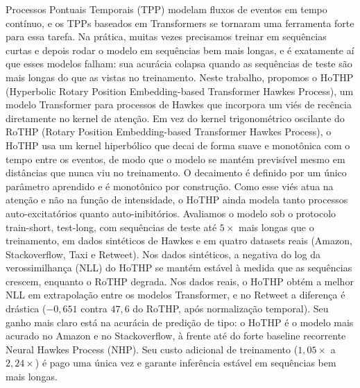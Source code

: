 Processos Pontuais Temporais (\gls{TPP}) modelam fluxos de eventos em tempo contínuo, e os TPPs baseados em Transformers se tornaram uma ferramenta forte para essa tarefa. Na prática, muitas vezes precisamos treinar em sequências curtas e depois rodar o modelo em sequências bem mais longas, e é exatamente aí que esses modelos falham: sua acurácia colapsa quando as sequências de teste são mais longas do que as vistas no treinamento. Neste trabalho, propomos o HoTHP (Hyperbolic Rotary Position Embedding-based Transformer Hawkes Process), um modelo Transformer para processos de Hawkes que incorpora um viés de recência diretamente no kernel de atenção. Em vez do kernel trigonométrico oscilante do RoTHP (Rotary Position Embedding-based Transformer Hawkes Process), o HoTHP usa um kernel hiperbólico que decai de forma suave e monotônica com o tempo entre os eventos, de modo que o modelo se mantém previsível mesmo em distâncias que nunca viu no treinamento. O decaimento é definido por um único parâmetro aprendido e é monotônico por construção. Como esse viés atua na atenção e não na função de intensidade, o HoTHP ainda modela tanto processos auto-excitatórios quanto auto-inibitórios. Avaliamos o modelo sob o protocolo train-short, test-long, com sequências de teste até $5\times$ mais longas que o treinamento, em dados sintéticos de Hawkes e em quatro datasets reais (Amazon, Stackoverflow, Taxi e Retweet). Nos dados sintéticos, a negativa do log da verossimilhança (\gls{NLL}) do HoTHP se mantém estável à medida que as sequências crescem, enquanto o RoTHP degrada. Nos dados reais, o HoTHP obtém a melhor NLL em extrapolação entre os modelos Transformer, e no Retweet a diferença é drástica ($-0{,}651$ contra $47{,}6$ do RoTHP, após normalização temporal). Seu ganho mais claro está na acurácia de predição de tipo: o HoTHP é o modelo mais acurado no Amazon e no Stackoverflow, à frente até do forte baseline recorrente Neural Hawkes Process (NHP). Seu custo adicional de treinamento ($1{,}05\times$ a $2{,}24\times$) é pago uma única vez e garante inferência estável em sequências bem mais longas.

